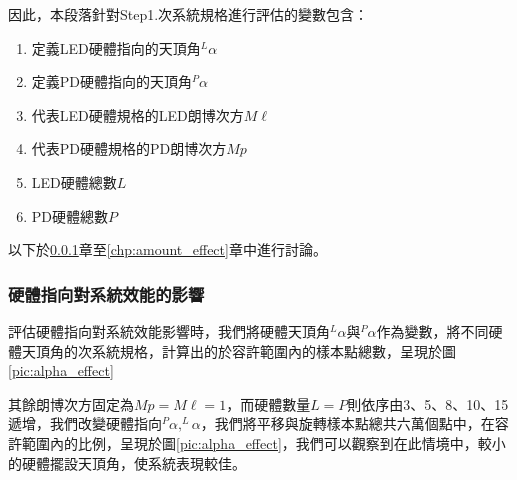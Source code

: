 因此，本段落針對Step1.次系統規格進行評估的變數包含：
\begin{enumerate}
    \item 定義LED硬體指向的天頂角$^L\alpha$
    \item 定義PD硬體指向的天頂角$^P\alpha$
    \item 代表LED硬體規格的LED朗博次方$M\ell$
    \item 代表PD硬體規格的PD朗博次方$Mp$
    \item LED硬體總數$L$
    \item PD硬體總數$P$

\end{enumerate}

以下於\ref{chp:orient_effect}章至\ref{chp:amount_effect}章中進行討論。


\subsubsection{硬體指向對系統效能的影響}
\label{chp:orient_effect}

評估硬體指向對系統效能影響時，我們將硬體天頂角$^L\alpha$與$^P\alpha$作為變數，將不同硬體天頂角的次系統規格，計算出的於容許範圍內的樣本點總數，呈現於圖\ref{pic:alpha_effect}

其餘朗博次方固定為$Mp=M\ell=1$，而硬體數量$L=P$則依序由3、5、8、10、15遞增，我們改變硬體指向$^P\alpha,^L\alpha$，我們將平移與旋轉樣本點總共六萬個點中，在容許範圍內的比例，呈現於圖\ref{pic:alpha_effect}，我們可以觀察到在此情境中，較小的硬體擺設天頂角，使系統表現較佳。




